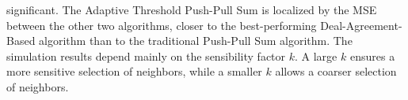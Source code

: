 significant. The Adaptive Threshold Push-Pull Sum is localized by the MSE between the other two algorithms, closer to the best-performing Deal-Agreement-Based algorithm than to the traditional Push-Pull Sum algorithm. The simulation results depend mainly on the sensibility factor $k$. A large $k$ ensures a more sensitive selection of neighbors, while a smaller $k$ allows a coarser selection of neighbors.
